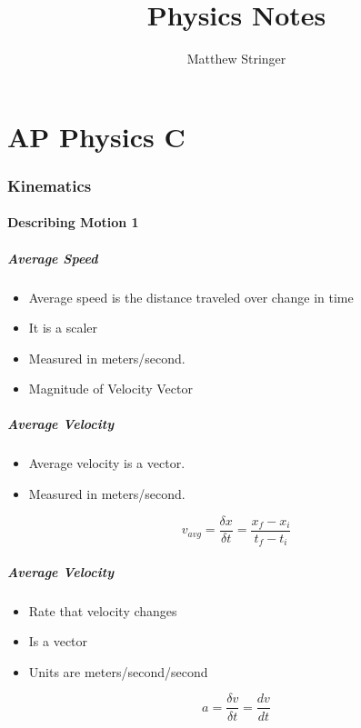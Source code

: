 \documentclass[12pt]{article}
\title{Physics Notes} %
\date{}
\author{Matthew Stringer} %
\theoremstyle{break}
\numberwithin{theorem}{subsection}
\numberwithin{lemma}{subsection}
\numberwithin{corollary}{subsection}
\numberwithin{equation}{subsection}
\begin{document}
\maketitle
\newpage
\tableofcontents


\newpage
\part{AP Physics C}

\section{Kinematics}
\subsection{Describing Motion 1}

\subsubsection{Average Speed}
\begin{itemize}
	\item Average speed is the distance traveled over change in time
	\item It is a scaler
	\item Measured in meters/second.
	\item Magnitude of Velocity Vector
\end{itemize}

\subsubsection{Average Velocity}
\begin{itemize}
	\item Average velocity is a vector.
	\item Measured in meters/second.
\end{itemize}
\begin{equation*}
v_{avg} = \frac{\delta x}{\delta t} = \frac{x_f - x_i}{t_f - t_i}
\end{equation*}

\subsubsection{Average Velocity}
\begin{itemize}
	\item Rate that velocity changes
	\item Is a vector
	\item Units are meters/second/second
\end{itemize}
\begin{equation*}
a = \frac{\delta v}{\delta t} = \frac{dv}{dt}
\end{equation*}
\end{document}
